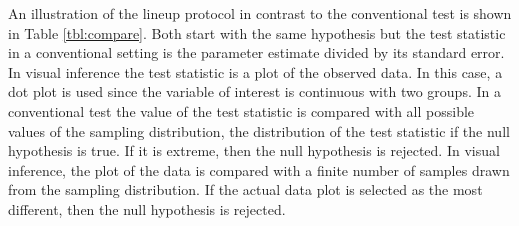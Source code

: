 An illustration of the lineup protocol in contrast to the conventional test is shown in Table \ref{tbl:compare}. Both start with the same hypothesis but the test statistic in a conventional setting is the parameter estimate divided by its standard error. In visual inference the test statistic is a plot of the observed data. In this case, a dot plot is used since the variable of interest is continuous with two groups. In a conventional test the value of the test statistic is compared with all possible values of the sampling distribution, the distribution of the test statistic if the null hypothesis is true. If it is extreme, then the null hypothesis is rejected. In visual inference, the plot of the data is compared with a finite number of samples drawn from the sampling distribution. If the actual data plot is selected as the most different, then the null hypothesis is rejected. 

